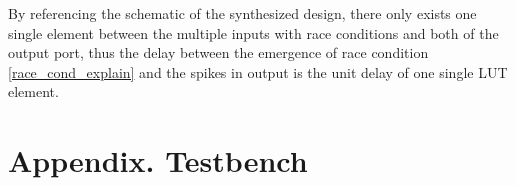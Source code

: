 \documentclass[conference]{IEEEtran}
\begin{document}
By referencing the schematic of the synthesized design, there only exists one single element between the multiple inputs with race conditions and both of the output port, thus the delay between the emergence of race condition \ref{race_cond_explain} and the spikes in output is the unit delay of one single LUT element.

\section*{\textbf{Appendix.} Testbench}


\end{document}
